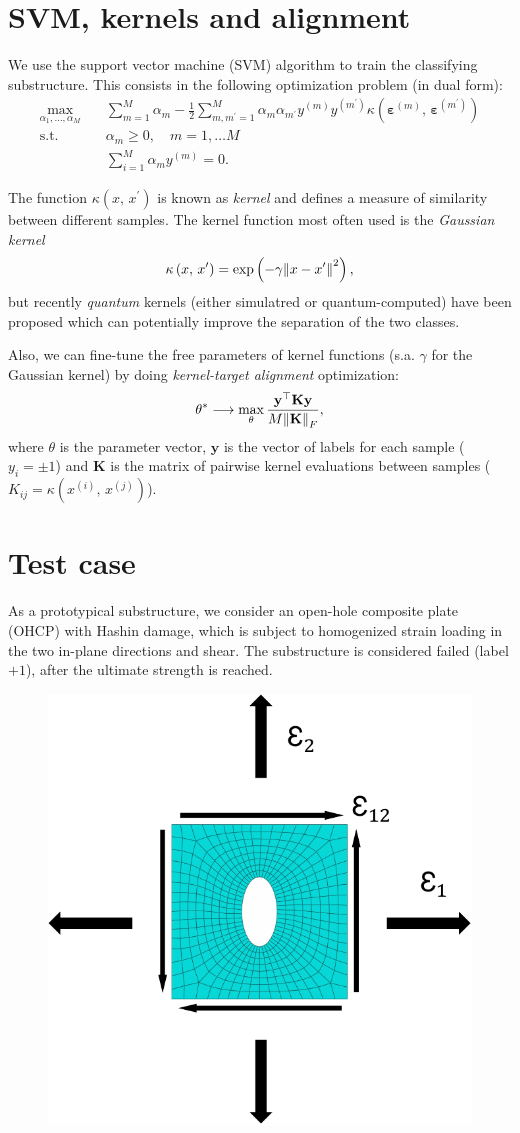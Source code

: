 \documentclass[9pt,a4paper]{extarticle}
\begin{document}
\begin{multicols}{2}
\section{SVM, kernels and alignment}
We use the support vector machine (SVM) algorithm to train the classifying substructure. This consists in the following optimization problem (in dual form):
\begin{displaymath}
    \begin{aligned}
      \max_{\alpha_1,\dots, \alpha_M} \quad & \sum_{m=1}^{M}\alpha_m - \frac{1}{2}\sum_{m,m^\prime=1}^{M}\alpha_m\alpha_{m^\prime}y^{(m)}y^{(m^\prime)}\kappa\left( \bm{\varepsilon}^{(m)},\, \bm{\varepsilon}^{(m^\prime)} \right) \\
      \mathrm{s.t.}\quad & \alpha_m \geq 0,\quad m=1,\dots M \\
      & \sum_{i=1}^M \alpha_m y^{(m)} = 0.
    \end{aligned}
\end{displaymath}

The function $\kappa\left(x,\, x^\prime\right)$ is known as \emph{kernel} and defines a measure of similarity between different samples. The kernel function most often used is the \emph{Gaussian kernel} 
\[\kappa\left(x,\, x^\prime\right) = \exp\left( -\gamma \norm{x - x^\prime}^2 \right),\]
but recently \emph{quantum} kernels \cite{Havlicek} (either simulatred or quantum-computed) have been proposed which can potentially improve the separation of the two classes.

Also, we can fine-tune the free parameters of kernel functions (s.a. $\gamma$ for the Gaussian kernel) by doing \emph{kernel-target alignment} optimization:
\[
    \theta^* \longrightarrow \max_\theta \frac{\mathbf{y}^\top \mathbf{K} \mathbf{y}}{M \norm{\mathbf{K}}_F},
\]
where $\theta$ is the parameter vector, $\mathbf{y}$ is the vector of labels for each sample ($y_i=\pm 1$) and $\mathbf{K}$ is the matrix of pairwise kernel evaluations between samples ($K_{ij} = \kappa\left(x^{(i)},\, x^{(j)}\right)$).


\section{Test case}
As a prototypical substructure, we consider an open-hole composite plate (OHCP) with Hashin damage, which is subject to homogenized strain loading in the two in-plane directions and shear. The substructure is considered failed (label $+1$), after the ultimate strength is reached.
\begin{figure}[H]
    \centering
    \includegraphics[width=.3\textwidth]{pics/ohcp-geom-loads.pdf}
\end{figure}


\end{multicols}
\end{document}
